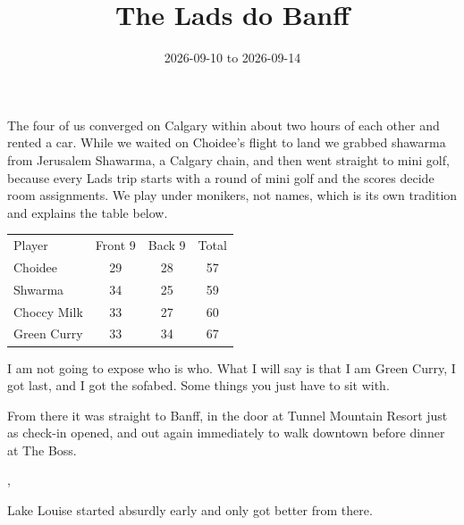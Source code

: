 
\title{The Lads do Banff}
\date{2026-09-10 to 2026-09-14}




The four of us converged on Calgary within about two hours of each other and
rented a car. While we waited on Choidee's flight to
land we grabbed shawarma from Jerusalem Shawarma, a Calgary chain, and then
went straight to mini golf, because every Lads trip starts with a round of
mini golf and the scores decide room assignments. We play under monikers, not
names, which is its own tradition and explains the table below.

\begin{tabular}{lccc}
  Player & Front 9 & Back 9 & Total \\
  Choidee & 29 & 28 & 57 \\
  Shwarma & 34 & 25 & 59 \\
  Choccy Milk & 33 & 27 & 60 \\
  Green Curry & 33 & 34 & 67 \\
\end{tabular}

I am not going to expose who is who. What I will say is that I am Green
Curry, I got last, and I got the sofabed. Some things you just have to sit
with.

From there it was straight to Banff, in the door at Tunnel Mountain Resort
just as check-in opened, and out again immediately to walk downtown before
dinner at The Boss.



\sep

Lake Louise started absurdly early and only got better from there.


